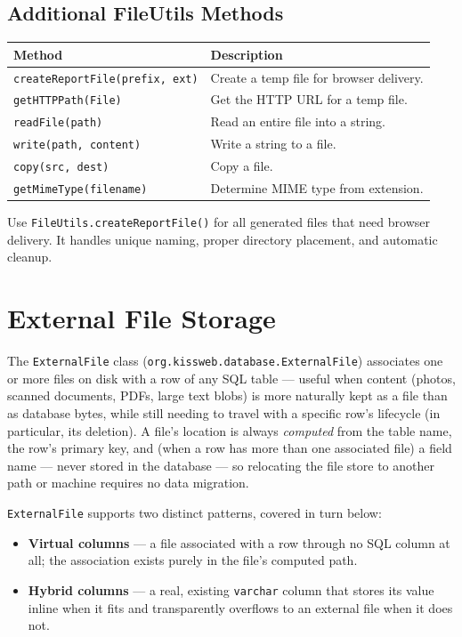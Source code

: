 \subsection{Additional FileUtils Methods}

\begin{longtable}{P{4.8cm}P{5.7cm}}
\toprule
\textbf{Method} & \textbf{Description} \\
\midrule
\endhead
\texttt{createReportFile(prefix, ext)} & Create a temp file for browser delivery. \\
\texttt{getHTTPPath(File)} & Get the HTTP URL for a temp file. \\
\texttt{readFile(path)} & Read an entire file into a string. \\
\texttt{write(path, content)} & Write a string to a file. \\
\texttt{copy(src, dest)} & Copy a file. \\
\texttt{getMimeType(filename)} & Determine MIME type from extension. \\
\bottomrule
\end{longtable}

\begin{tipbox}
Use \texttt{FileUtils.createReportFile()} for all generated files that need browser delivery.  It handles unique naming, proper directory placement, and automatic cleanup.
\end{tipbox}

\section{External File Storage}
\label{sec:file-external}

The \texttt{ExternalFile} class (\texttt{org.kissweb.database.ExternalFile}) associates one or more files on disk with a row of any SQL table --- useful when content (photos, scanned documents, PDFs, large text blobs) is more naturally kept as a file than as database bytes, while still needing to travel with a specific row's lifecycle (in particular, its deletion). A file's location is always \emph{computed} from the table name, the row's primary key, and (when a row has more than one associated file) a field name --- never stored in the database --- so relocating the file store to another path or machine requires no data migration.

\texttt{ExternalFile} supports two distinct patterns, covered in turn below:

\begin{itemize}
  \item \textbf{Virtual columns} --- a file associated with a row through no SQL column at all; the association exists purely in the file's computed path.
  \item \textbf{Hybrid columns} --- a real, existing \texttt{varchar} column that stores its value inline when it fits and transparently overflows to an external file when it does not.
\end{itemize}

